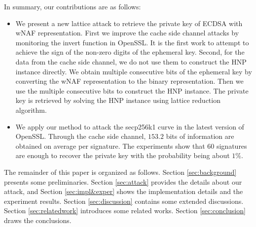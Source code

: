 

In summary, our contributions are as follows:
\begin{itemize}
  \item
  We present a new lattice attack to retrieve the private key of ECDSA with wNAF representation.
  First we
    improve the cache side channel attacks by monitoring
      the invert function in OpenSSL.
      It is the first work to attempt to achieve the sign of the non-zero digits of the ephemeral key.
   Second, for the data from the cache side channel, we do not use them to construct the HNP instance directly.
    We obtain multiple consecutive bits of the ephemeral key by converting the wNAF representation to the binary representation.
    Then we use the multiple consecutive bits to construct the HNP instance.
The private key is retrieved by solving the HNP instance using lattice reduction algorithm.

  \item
    We apply our method to attack the secp256k1 curve in the latest version of OpenSSL.
     Through the cache side channel, $153.2$ bits of information are obtained on average per signature.
    The experiments show that $60$ signatures are enough to recover the private key with the probability being about $1\%$.
\end{itemize}

The remainder of this paper is organized as follows.
Section \ref{sec:background} presents some preliminaries.
Section \ref{sec:attack} provides the details about our attack,
and Section \ref{sec:impl&exper} shows the implementation details and the experiment results.
Section \ref{sec:discussion} contains some extended discussions.
Section \ref{sec:relatedwork} introduces some related works.
Section \ref{sec:conclusion} draws the conclusions.

%
%

